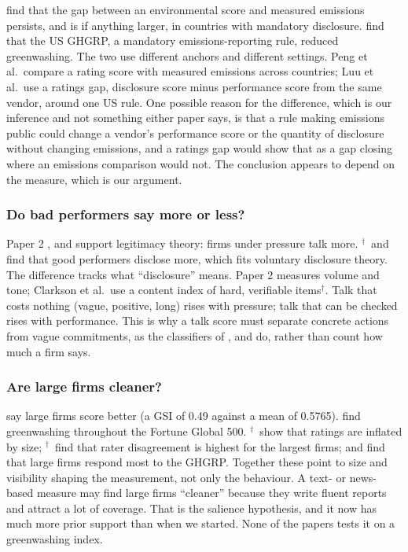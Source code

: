 \documentclass[12pt,a4paper]{article}
\newcommand{\dg}{$^{\dagger}$}          %
\begin{document}
\citet{peng2024} find that the gap between an environmental score and measured emissions persists,
and is if anything larger, in countries with mandatory disclosure. \citet{luu2025} find that the
US GHGRP, a mandatory emissions-reporting rule, reduced greenwashing. The two use different
anchors and different settings. Peng et al.\ compare a rating score with measured emissions across
countries; Luu et al.\ use a ratings gap, disclosure score minus performance score from the same
vendor, around one US rule. One possible reason for the difference, which is our inference and not
something either paper says, is that a rule making emissions public could change a vendor's
performance score or the quantity of disclosure without changing emissions, and a ratings gap
would show that as a gap closing where an emissions comparison would not. The conclusion appears to
depend on the measure, which is our argument.

\subsubsection{Do bad performers say more or less?}

Paper 2 \citep{gorovaia2025}, \citet{cho2015} and \citet{cho2009} support legitimacy theory: firms
under pressure talk more. \citet{clarkson2008}\dg\ and \citet{tadros2019} find that good performers
disclose more, which fits voluntary disclosure theory. The difference tracks what ``disclosure''
means. Paper 2 measures volume and tone; Clarkson et al.\ use a content index of hard, verifiable
items\dg. Talk that costs nothing (vague, positive, long) rises with pressure; talk that can be
checked rises with performance. This is why a talk score must separate concrete actions from vague
commitments, as the classifiers of \citet{wang2025}, \citet{bingler2022} and \citet{bingler2024} do,
rather than count how much a firm says.

\subsubsection{Are large firms cleaner?}

\citet{davidescu2026} say large firms score better (a GSI of 0.49 against a mean of 0.5765).
\citet{peng2024} find greenwashing throughout the Fortune Global 500. \citet{drempetic2020}\dg\ show
that ratings are inflated by size; \citet{gibsonbrandon2021}\dg\ find that rater disagreement is
highest for the largest firms; and \citet{luu2025} find that large firms respond most to the GHGRP.
Together these point to size and visibility shaping the measurement, not only the behaviour. A
text- or news-based measure may find large firms ``cleaner'' because they write fluent reports and
attract a lot of coverage. That is the salience hypothesis, and it now has much more prior support
than when we started. None of the papers tests it on a greenwashing index.
\end{document}
